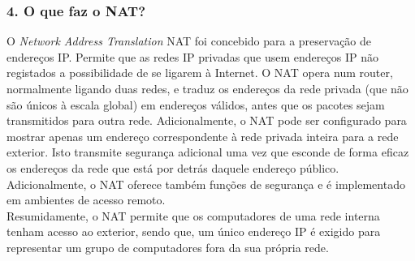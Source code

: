 \subsubsection{4. O que faz o NAT?}
O \emph{Network Address Translation} NAT foi concebido para a preservação de endereços IP. Permite que as redes IP privadas que usem endereços IP não registados a possibilidade de se ligarem à Internet. O NAT opera num router, normalmente ligando duas redes, e traduz os endereços da rede privada (que não são únicos à escala global) em endereços válidos, antes que os pacotes sejam transmitidos para outra rede.
Adicionalmente, o NAT pode ser configurado para mostrar apenas um endereço correspondente à rede privada inteira para a rede exterior. Isto transmite segurança adicional uma vez que esconde de forma eficaz os endereços da rede que está por detrás daquele endereço público. Adicionalmente, o NAT oferece também funções de segurança e é implementado em
ambientes de acesso remoto.\\
Resumidamente, o NAT permite que os computadores de uma rede interna tenham acesso ao exterior, sendo que, um único endereço IP é exigido para representar um grupo de computadores fora da sua própria rede. 

